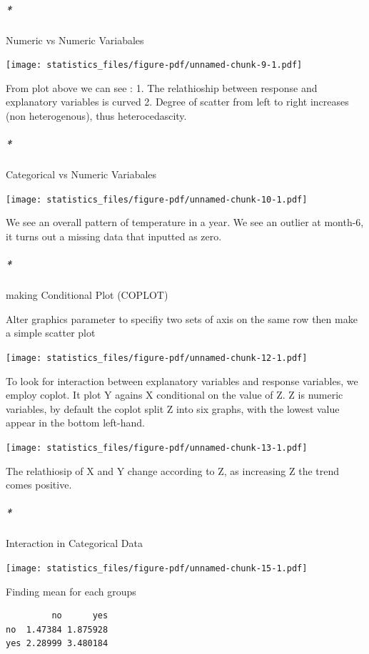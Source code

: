 \documentclass[
  letterpaper,
  DIV=11,
  numbers=noendperiod]{scrreprt}
\let\oldsubparagraph\subparagraph
\renewcommand{\subparagraph}[1]{\oldsubparagraph{#1}\mbox{}}
\begin{document}
\subparagraph*{Numeric vs Numeric
Variabales}\label{numeric-vs-numeric-variabales}

\texttt{[image: statistics\_files/figure-pdf/unnamed-chunk-9-1.pdf]}

From plot above we can see : 1. The relathioship between response and
explanatory variables is curved 2. Degree of scatter from left to right
increases (non heterogenous), thus heterocedascity.

\subparagraph*{Categorical vs Numeric
Variabales}\label{categorical-vs-numeric-variabales}

\texttt{[image: statistics\_files/figure-pdf/unnamed-chunk-10-1.pdf]}

We see an overall pattern of temperature in a year. We see an outlier at
month-6, it turns out a missing data that inputted as zero.

\subparagraph*{making Conditional Plot
(COPLOT)}\label{making-conditional-plot-coplot}

Alter graphics parameter to specifiy two sets of axis on the same row
then make a simple scatter plot

\texttt{[image: statistics\_files/figure-pdf/unnamed-chunk-12-1.pdf]}

To look for interaction between explanatory variables and response
variables, we employ coplot. It plot Y agains X conditional on the value
of Z. Z is numeric variables, by default the coplot split Z into six
graphs, with the lowest value appear in the bottom left-hand.

\texttt{[image: statistics\_files/figure-pdf/unnamed-chunk-13-1.pdf]}

The relathiosip of X and Y change according to Z, as increasing Z the
trend comes positive.

\subparagraph*{Interaction in Categorical
Data}\label{interaction-in-categorical-data}

\texttt{[image: statistics\_files/figure-pdf/unnamed-chunk-15-1.pdf]}

Finding mean for each groups

\begin{verbatim}
         no      yes
no  1.47384 1.875928
yes 2.28999 3.480184
\end{verbatim}
\end{document}
